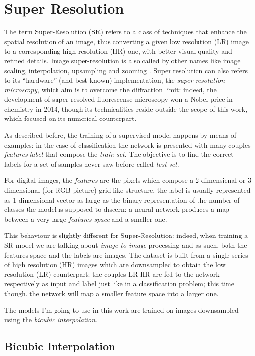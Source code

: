 \documentclass[12pt,a4paper]{report}
\begin{document}
\section{Super Resolution}

The term Super-Resolution (SR) refers to a class of techniques that enhance the spatial resolution of an image, thus converting a given low resolution (LR) image to a corresponding high resolution (HR) one, with better visual quality and refined details.
Image super-resolution is also called by other names like image scaling, interpolation, upsampling and zooming \cite{survey-sr}.
Super resolution can also refers to its ``hardware'' (and best-known) implementation, the {\it super resolution microscopy}, which aim is to overcome the diffraction limit: indeed, the development of super-resolved fluorescense microscopy won a Nobel price in chemistry in 2014, though its technicalities reside outside the scope of this work, which focused on its numerical counterpart.

As described before, the training of a supervised model happens by means of examples: in the case of classification the network is presented with many couples {\it features-label} that compose the {\it train set}. The objective is to find the correct labels for a set of samples never saw before called {\it test set}.

For digital images, the {\it features} are the pixels which compose a 2 dimensional or 3 dimensional (for RGB picture) grid-like structure, the label is usually represented as 1 dimensional vector as large as the binary representation of the number of classes the model is supposed to  discern: a neural network produces a map between a very large {\it features space} and a smaller one.

This behaviour is slightly different for Super-Resolution: indeed, when training a SR model we are talking about {\it image-to-image} processing and as such, both the features space and the labels are images.  
The dataset is built from a single series of high resolution (HR) images which are downsampled to obtain the low resolution (LR) counterpart: the couples LR-HR are fed to the network respectively as input and label just like in a classification problem; this time though, the network will map a smaller feature space into a larger one. 

The models I'm going to use in this work are trained on images downsampled using the {\it bicubic interpolation}.

\subsection{Bicubic Interpolation}
\end{document}
